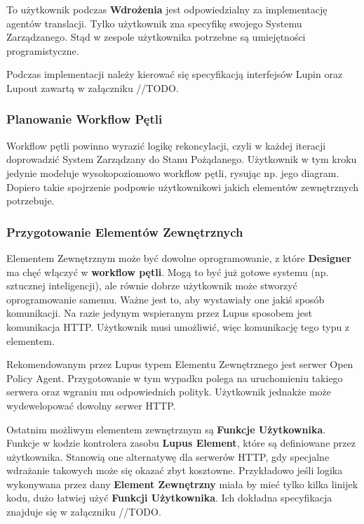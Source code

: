 To użytkownik podczas \textbf{Wdrożenia} jest odpowiedzialny za implementację agentów translacji. Tylko użytkownik zna specyfikę swojego Systemu Zarządzanego. Stąd w zespole użytkownika potrzebne są umiejętności programistyczne. 

Podczas implementacji należy kierować się specyfikacją interfejsów Lupin oraz Lupout zawartą w załączniku //TODO.

\subsubsection{Planowanie Workflow Pętli}

Workflow pętli powinno wyrazić logikę rekoncylacji, czyli w każdej iteracji doprowadzić System Zarządzany do Stanu Pożądanego. Użytkownik w tym kroku jedynie modeluje wysokopoziomowo workflow pętli, rysując np. jego diagram. Dopiero takie spojrzenie podpowie użytkownikowi jakich elementów zewnętrznych potrzebuje.

\subsubsection{Przygotowanie Elementów Zewnętrznych}

Elementem Zewnętrznym może być dowolne oprogramowanie, z które \textbf{Designer} ma chęć włączyć w \textbf{workflow pętli}. Mogą to być już gotowe systemu (np. sztucznej inteligencji), ale równie dobrze użytkownik może stworzyć oprogramowanie samemu. Ważne jest to, aby wystawiały one jakiś sposób komunikacji. Na razie jedynym wspieranym przez Lupus sposobem jest komunikacja HTTP. Użytkownik musi umożliwić, więc komunikację tego typu z elementem.

Rekomendowanym przez Lupus typem Elementu Zewnętrznego jest serwer Open Policy Agent. Przygotowanie w tym wypadku polega na uruchomieniu takiego serwera oraz wgraniu mu odpowiednich polityk. Użytkownik jednakże może wydewelopować dowolny serwer HTTP.

Ostatnim możliwym elementem zewnętrznym są \textbf{Funkcje Użytkownika}. Funkcje w kodzie kontrolera zasobu \textbf{Lupus Element}, które są definiowane przez użytkownika. Stanowią one alternatywę dla serwerów HTTP, gdy specjalne wdrażanie takowych może się okazać zbyt kosztowne. Przykładowo jeśli logika wykonywana przez dany \textbf{Element Zewnętrzny} miała by mieć tylko kilka linijek kodu, dużo łatwiej użyć \textbf{Funkcji Użytkownika}. Ich dokładna specyfikacja znajduje się w załączniku //TODO.

